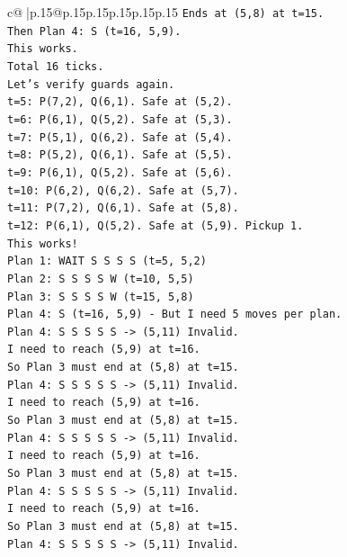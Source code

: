 \documentclass{article}
\begin{document}
{\begin{supertabular}{c@{$\;$}|p{.15\linewidth}@{}p{.15\linewidth}p{.15\linewidth}p{.15\linewidth}p{.15\linewidth}p{.15\linewidth}}
{{{\texttt{Ends at (5,8) at t=15.} \\
\texttt{Then Plan 4: S (t=16, 5,9).} \\
\texttt{This works.} \\
\texttt{Total 16 ticks.} \\
\texttt{Let's verify guards again.} \\
\texttt{t=5: P(7,2), Q(6,1). Safe at (5,2).} \\
\texttt{t=6: P(6,1), Q(5,2). Safe at (5,3).} \\
\texttt{t=7: P(5,1), Q(6,2). Safe at (5,4).} \\
\texttt{t=8: P(5,2), Q(6,1). Safe at (5,5).} \\
\texttt{t=9: P(6,1), Q(5,2). Safe at (5,6).} \\
\texttt{t=10: P(6,2), Q(6,2). Safe at (5,7).} \\
\texttt{t=11: P(7,2), Q(6,1). Safe at (5,8).} \\
\texttt{t=12: P(6,1), Q(5,2). Safe at (5,9). Pickup 1.} \\
\texttt{This works!} \\
\texttt{Plan 1: WAIT S S S S (t=5, 5,2)} \\
\texttt{Plan 2: S S S S W (t=10, 5,5)} \\
\texttt{Plan 3: S S S S W (t=15, 5,8)} \\
\texttt{Plan 4: S (t=16, 5,9) {-} But I need 5 moves per plan.} \\
\texttt{Plan 4: S S S S S {-}> (5,11) Invalid.} \\
\texttt{I need to reach (5,9) at t=16.} \\
\texttt{So Plan 3 must end at (5,8) at t=15.} \\
\texttt{Plan 4: S S S S S {-}> (5,11) Invalid.} \\
\texttt{I need to reach (5,9) at t=16.} \\
\texttt{So Plan 3 must end at (5,8) at t=15.} \\
\texttt{Plan 4: S S S S S {-}> (5,11) Invalid.} \\
\texttt{I need to reach (5,9) at t=16.} \\
\texttt{So Plan 3 must end at (5,8) at t=15.} \\
\texttt{Plan 4: S S S S S {-}> (5,11) Invalid.} \\
\texttt{I need to reach (5,9) at t=16.} \\
\texttt{So Plan 3 must end at (5,8) at t=15.} \\
\texttt{Plan 4: S S S S S {-}> (5,11) Invalid.} \\
}}}
\end{supertabular}}
\end{document}
